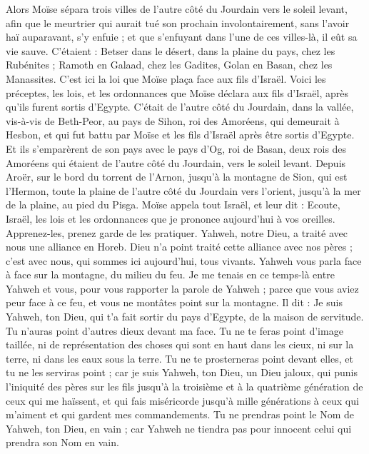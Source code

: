 \begin{multicols}{2}
Alors Moïse sépara trois villes de l’autre côté du Jourdain vers le soleil levant,
afin que le meurtrier qui aurait tué son prochain involontairement, sans l'avoir haï auparavant, s'y enfuie ; et que s’enfuyant dans l'une de ces villes-là, il eût sa vie sauve.
C’étaient : Betser dans le désert, dans la plaine du pays, chez les Rubénites ; Ramoth en Galaad, chez les Gadites, Golan en Basan, chez les Manassites.
C'est ici la loi que Moïse plaça face aux fils d'Israël.
Voici les préceptes, les lois, et les ordonnances que Moïse déclara aux fils d'Israël, après qu'ils furent sortis d'Egypte.
C’était de l’autre côté du Jourdain, dans la vallée, vis-à-vis de Beth-Peor, au pays de Sihon, roi des Amoréens, qui demeurait à Hesbon, et qui fut battu par Moïse et les fils d'Israël après être sortis d'Egypte.
Et ils s’emparèrent de son pays avec le pays d’Og, roi de Basan, deux rois des Amoréens qui étaient de l’autre côté du Jourdain, vers le soleil levant.
Depuis Aroër, sur le bord du torrent de l'Arnon, jusqu'à la montagne de Sion, qui est l’Hermon,
toute la plaine de l’autre côté du Jourdain vers l'orient, jusqu'à la mer de la plaine, au pied du Pisga.
\VerseOne{}Moïse appela tout Israël, et leur dit : Ecoute, Israël, les lois et les ordonnances que je prononce aujourd'hui à vos oreilles. Apprenez-les, prenez garde de les pratiquer.
Yahweh, notre Dieu, a traité avec nous une alliance en Horeb.
Dieu n'a point traité cette alliance avec nos pères ; c’est avec nous, qui sommes ici aujourd'hui, tous vivants.
Yahweh vous parla face à face sur la montagne, du milieu du feu.
Je me tenais en ce temps-là entre Yahweh et vous, pour vous rapporter la parole de Yahweh ; parce que vous aviez peur face à ce feu, et vous ne montâtes point sur la montagne. Il dit\FTNT{} :
Je suis Yahweh, ton Dieu, qui t’a fait sortir du pays d'Egypte, de la maison de servitude.
Tu n'auras point d'autres dieux devant ma face.
Tu ne te feras point d'image taillée, ni de représentation des choses qui sont en haut dans les cieux, ni sur la terre, ni dans les eaux sous la terre.
Tu ne te prosterneras point devant elles, et tu ne les serviras point ; car je suis Yahweh, ton Dieu, un Dieu jaloux, qui punis l'iniquité des pères sur les fils jusqu'à la troisième et à la quatrième génération de ceux qui me haïssent,
et qui fais miséricorde jusqu'à mille générations à ceux qui m'aiment et qui gardent mes commandements.
Tu ne prendras point le Nom de Yahweh, ton Dieu, en vain ; car Yahweh ne tiendra pas pour innocent celui qui prendra son Nom en vain.

\end{multicols}

